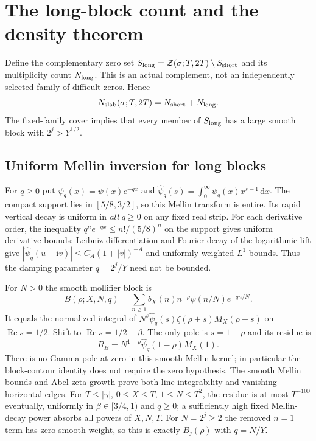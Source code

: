 \documentclass[11pt,a4paper]{article}
\numberwithin{equation}{section}
\theoremstyle{definition}
\newcommand{\dd}{\,\mathrm d}
\newcommand{\ii}{\mathrm i}
\newcommand{\Rea}{\operatorname{Re}}
\begin{document}
\section{The long-block count and the density theorem}
\label{sec:long}
Define the complementary zero set
$S_{\rm long}=\mathcal Z(\sigma;T,2T)\setminus S_{\rm short}$ and its
multiplicity count $N_{\rm long}$. This is an actual complement, not an
independently selected family of difficult zeros. Hence
\begin{equation}\label{eq:partition}
 N_{\rm slab}(\sigma;T,2T)=N_{\rm short}+N_{\rm long}.
\end{equation}
The fixed-family cover implies that every member of $S_{\rm long}$ has a
large smooth block with $2^j>Y^{1/2}$.

\subsection{Uniform Mellin inversion for long blocks}
For $q\ge0$ put $\psi_q(x)=\psi(x)e^{-qx}$ and
$\widehat\psi_q(s)=\int_0^\infty\psi_q(x)x^{s-1}\dd x$.
The compact support lies in $[5/8,3/2]$, so this Mellin transform is entire.
Its rapid vertical decay is uniform in \emph{all} $q\ge0$ on any fixed
real strip. For each derivative order, the inequality
$q^ne^{-qx}\le n!/(5/8)^n$ on the support gives uniform derivative bounds;
Leibniz differentiation and Fourier decay of the logarithmic lift give
$|\widehat\psi_q(u+\ii v)|\le C_A(1+|v|)^{-A}$ and uniformly weighted
$L^1$ bounds. Thus the damping parameter $q=2^j/Y$ need not be bounded.

For $N>0$ the smooth mollifier block is
\[
 B(\rho;X,N,q)=\sum_{n\ge1}b_X(n)n^{-\rho}\psi(n/N)e^{-qn/N}.
\]
It equals the normalized integral of
$N^s\widehat\psi_q(s)\zeta(\rho+s)M_X(\rho+s)$ on $\Rea s=1/2$.
Shift to $\Rea s=1/2-\beta$. The only pole is $s=1-\rho$ and its residue is
\[
 R_B=N^{1-\rho}\widehat\psi_q(1-\rho)M_X(1).
\]
There is no Gamma pole at zero in this smooth Mellin kernel; in particular the
block-contour identity does not require the zero hypothesis. The smooth
Mellin bounds and Abel zeta growth prove both-line integrability and vanishing
horizontal edges. For $T\le|\gamma|$, $0\le X\le T$,
$1\le N\le T^2$, the residue is at most $T^{-100}$ eventually,
uniformly in $\beta\in[3/4,1)$ and $q\ge0$; a sufficiently high fixed
Mellin-decay power absorbs all powers of $X,N,T$.
For $N=2^j\ge2$ the removed $n=1$ term has zero smooth weight, so this is
exactly $B_j(\rho)$ with $q=N/Y$.
\end{document}
